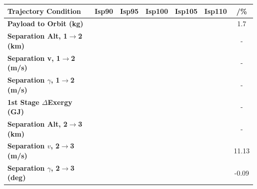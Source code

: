 \begin{table}[ht]
	\centering
\begin{tabular}{l c c c c c c} 
	\hline \textbf{Trajectory Condition}
	&Isp90
	&Isp95
	&Isp100
	&Isp105
	&Isp110
	& /\%
	\\
	\hline \textbf{Payload to Orbit (kg)}
	& \PayloadToOrbitIspNinety
	& \PayloadToOrbitIspNinetyFive
	& \PayloadToOrbitIspStandard
	& \PayloadToOrbitIspOneHundredFive
	& \PayloadToOrbitIspOneHundredTen
	&1.7
	\\
	\textbf{Separation Alt, 1$\rightarrow$2 (km)}
	& \firstsecondSeparationAltIspNinety
	& \firstsecondSeparationAltIspNinetyFive
	& \firstsecondSeparationAltIspStandard
	& \firstsecondSeparationAltIspOneHundredFive
	& \firstsecondSeparationAltIspOneHundredTen
	& -
	\\
	\textbf{Separation v, 1$\rightarrow$2 (m/s)}
	& \firstsecondSeparationvIspNinety
	& \firstsecondSeparationvIspNinetyFive
	& \firstsecondSeparationvIspStandard
	& \firstsecondSeparationvIspOneHundredFive
	& \firstsecondSeparationvIspOneHundredTen
	& -
	\\
	\textbf{Separation $\gamma$, 1$\rightarrow$2 (m/s)}
	& \firstsecondSeparationgammaIspNinety
	& \firstsecondSeparationgammaIspNinetyFive
	& \firstsecondSeparationgammaIspStandard
	& \firstsecondSeparationgammaIspOneHundredFive
	& \firstsecondSeparationgammaIspOneHundredTen
	& -
	\\
	\textbf{1st Stage $\Delta$Exergy (GJ)}
	& \firstdExergyIspNinety
	& \firstdExergyIspNinetyFive
	& \firstdExergyIspStandard
	& \firstdExergyIspOneHundredFive
	& \firstdExergyIspOneHundredTen
	& -
	\\
	\textbf{Separation Alt, 2$\rightarrow$3 (km)}
	& \secondthirdSeparationAltIspNinety
	& \secondthirdSeparationAltIspNinetyFive
	& \secondthirdSeparationAltIspStandard
	& \secondthirdSeparationAltIspOneHundredFive
	& \secondthirdSeparationAltIspOneHundredTen
	& -
	\\
	\textbf{Separation $v$, 2$\rightarrow$3 (m/s)}
	& \secondthirdSeparationvIspNinety
	& \secondthirdSeparationvIspNinetyFive
	& \secondthirdSeparationvIspStandard
	& \secondthirdSeparationvIspOneHundredFive
	& \secondthirdSeparationvIspOneHundredTen
	&11.13
	\\
	\textbf{Separation $\gamma$, 2$\rightarrow$3 (deg)}
	& \secondthirdSeparationgammaIspNinety
	& \secondthirdSeparationgammaIspNinetyFive
	& \secondthirdSeparationgammaIspStandard
	& \secondthirdSeparationgammaIspOneHundredFive
	& \secondthirdSeparationgammaIspOneHundredTen
	&-0.09
	\\

\end{tabular}
\end{table}
